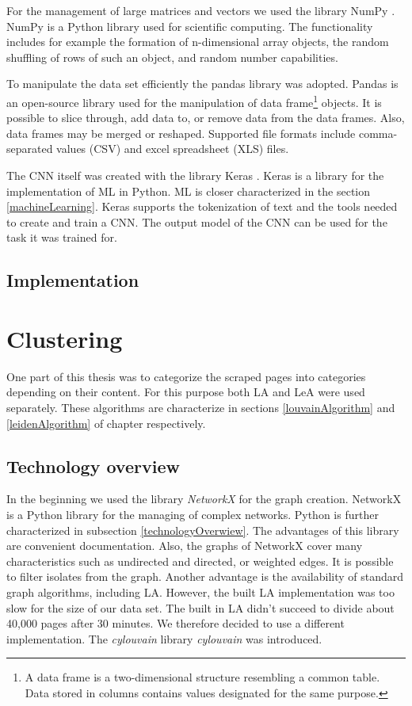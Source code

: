 For the management of large matrices and vectors we used the library NumPy \cite{numpy}. NumPy is a Python library used for scientific computing. The functionality includes for example the formation of n-dimensional array objects, the random shuffling of rows of such an object, and random number capabilities. 

To manipulate the data set efficiently the pandas library \cite{pandas} was adopted. Pandas is an open-source library used for the manipulation of data frame\footnote{A data frame is a two-dimensional structure resembling a common table. Data stored in columns contains values designated for the same purpose. } objects. It is possible to slice through, add data to, or remove data from the data frames. Also, data frames may be merged or reshaped. Supported file formats include comma-separated values (CSV) and excel spreadsheet (XLS) files.

The CNN itself was created with the library Keras \cite{keras}. Keras is a library for the implementation of ML in Python. ML is closer characterized in the section \ref{machineLearning}. Keras supports the tokenization of text and the tools needed to create and train a CNN. The output model of the CNN can be used for the task it was trained for.

\subsection{Implementation} \label{ClassificationImplementation}

\section{Clustering}\label{ClusteringDevelopment}
One part of this thesis was to categorize the scraped pages into categories depending on their content. For this purpose both LA and LeA were used separately. These algorithms are characterize in sections \ref{louvainAlgorithm} and \ref{leidenAlgorithm} of chapter respectively. 

\subsection{Technology overview} \label{ClusteringTechonologyOverview}
In the beginning we used the library \textit{NetworkX} \cite{networkX} for the graph creation. NetworkX is a Python library for the managing of complex networks. Python is further characterized in subsection \ref{technologyOverwiew}. The advantages of this library are convenient documentation. Also, the graphs of NetworkX cover many characteristics such as undirected and directed, or weighted edges. It is possible to filter isolates from the graph.  Another advantage is the availability of standard graph algorithms, including LA. However, the built LA implementation was too slow for the size of our data set. The built in LA didn't succeed to divide about 40,000 pages after 30 minutes. We therefore decided to use a different implementation. The \textit{cylouvain} library \textit{cylouvain} was introduced. 

